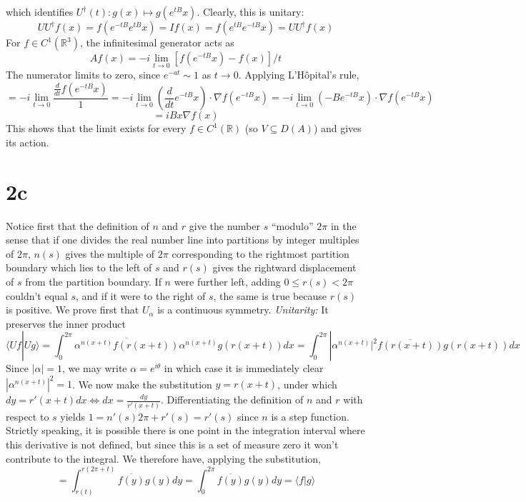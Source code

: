\documentclass{article}
\begin{document}
which identifies $U^{\dagger}(t): g(x)\mapsto g(e^{tB}x)$.
Clearly, this is unitary:
\[
  UU^{\dagger}f(x)=f(e^{-tB}e^{tB}x)=If(x)=f(e^{tB}e^{-tB}x)=UU^{\dagger}f(x)
\]
For $f\in C^{1}(\mathbb{R}^{3})$, the infinitesimal generator acts as
\[
  Af(x)=-i\lim_{t\to 0}[f(e^{-tB}x)-f(x)]/t
\]
The numerator limits to zero, since $e^{-at}\sim1$ as $t\to 0$.
Applying L'H\^opital's rule,
\[
  =-i\lim_{t\to 0}\frac{\frac{d}{dt}f(e^{-tB}x)}{1}
  =-i\lim_{t\to 0}\left( \frac{d}{dt}e^{-tB}x \right)\cdot\nabla f(e^{-tB}x)
  =-i\lim_{t\to 0}\left(-Be^{-tB}x\right)\cdot\nabla f(e^{-tB}x)
\]
\[
  =iBx\nabla f(x)
\]
This shows that the limit exists for every $f\in C^{1}(\mathbb{R})$ (so $V\subseteq D(A)$) and gives its action.

\section*{2c} %
Notice first that the definition of $n$ and $r$ give the number $s$ ``modulo'' $2\pi$ in the sense that if one divides the real number
line into partitions by integer multiples of $2\pi$, $n(s)$ gives the multiple of $2\pi$ corresponding to the rightmost partition boundary
which lies to the left of $s$ and $r(s)$ gives the rightward displacement of $s$ from the partition boundary.
If $n$ were further left, adding $0\leq r(s)< 2\pi$ couldn't equal $s$, and if it were to the right of $s$, the same is true because $r(s)$
is positive.
We prove first that $U_{\alpha}$ is a continuous symmetry.\newline
\textit{Unitarity:}
It preserves the inner product
\[
  \langle Uf|Ug \rangle
  =\int_{0}^{2\pi}\overline{\alpha^{n(x+t)}f(r(x+t))}\alpha^{n(x+t)}g(r(x+t))dx
  =\int_{0}^{2\pi}|\alpha^{n(x+t)}|^{2}\overline{f(r(x+t))}g(r(x+t))dx
\]
Since $|\alpha|=1$, we may write $\alpha=e^{i\theta}$ in which case it is immediately clear $|\alpha^{n(x+t)}|^{2}=1$.
We now make the substitution $y=r(x+t)$, under which $dy=r'(x+t)dx\Leftrightarrow dx=\frac{dy}{r'(x+t)}$.
Differentiating the definition of $n$ and $r$ with respect to $s$ yields $1=n'(s)2\pi+r'(s)=r'(s)$ since $n$ is a step function.
Strictly speaking, it is possible there is one point in the integration interval where this derivative is not defined,
but since this is a set of measure zero it won't contribute to the integral. %
We therefore have, applying the substitution,
\[
  =\int_{r(t)}^{r(2\pi+t)}\overline{f(y)}g(y)dy=\int_{0}^{2\pi}\overline{f(y)}g(y)dy=\langle f |g\rangle
\]
\end{document}
